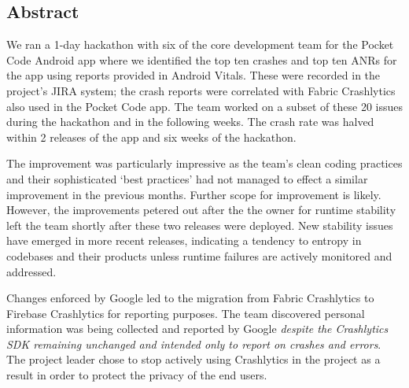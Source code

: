 

\subsection{Abstract}
We ran a 1-day hackathon with six of the core development team for the Pocket Code Android app where we identified the top ten crashes and top ten ANRs for the app using reports provided in Android Vitals. These were recorded in the project's JIRA system; the crash reports were correlated with Fabric Crashlytics also used in the Pocket Code app. The team worked on a subset of these 20 issues during the hackathon and in the following weeks. The crash rate was halved within 2 releases of the app and six weeks of the hackathon. 


The improvement was particularly impressive as the team's clean coding practices and their sophisticated `best practices' had not managed to effect a similar improvement in the previous months. Further scope for improvement is likely. However, the improvements petered out after the the owner for runtime stability left the team shortly after these two releases were deployed. New stability issues have emerged in more recent releases, indicating a tendency to entropy in codebases and their products unless runtime failures are actively monitored and addressed.

Changes enforced by Google led to the migration from Fabric Crashlytics to Firebase Crashlytics for reporting purposes. The team discovered personal information was being collected and reported by Google \textit{despite the Crashlytics SDK remaining unchanged and intended only to report on crashes and errors}. The project leader chose to stop actively using Crashlytics in the project as a result in order to protect the privacy of the end users.

